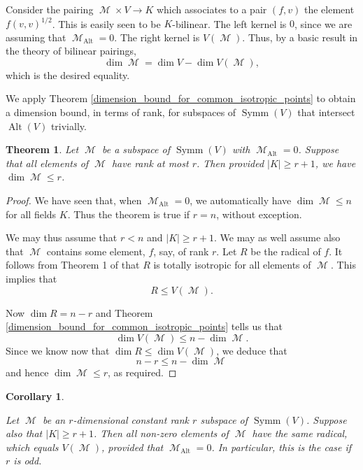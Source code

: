 \documentclass{amsart}
\DeclareMathOperator{\Alt}{Alt}
\DeclareMathOperator{\M}{\mathcal{M}}
\DeclareMathOperator{\Symm}{Symm}
\theoremstyle{plain}
\newtheorem{theorem}{Theorem}
\newtheorem{corollary}{Corollary}
\theoremstyle{definition}
\begin{document}
Consider the pairing $\M\times V\to K$ which associates to a pair $(f,v)$ the element $f(v,v)^{1/2}$. This is easily seen to be $K$-bilinear.
The left kernel is $0$, since we are assuming that $\M_{\Alt}=0$. The right kernel is $V(\M)$. Thus, by a basic result in the theory of
bilinear pairings,
\[
 \dim \M=\dim V-\dim V(\M),
\]
which is the desired equality.

We apply Theorem \ref{dimension_bound_for_common_isotropic_points} to obtain a dimension bound, in terms of rank, 
for subspaces of $\Symm(V)$ that intersect $\Alt(V)$ trivially.


\begin{theorem} \label{rank_related_dimension_bound}
Let $\M$ be a subspace of $\Symm(V)$ with $\M_{\Alt}=0$. Suppose that all elements of $\M$ have rank at most $r$. Then provided $|K|\geq r+1$,
we have $\dim \M\leq r$. 
\end{theorem}

\begin{proof}
 
We have seen that, when $\M_{\Alt}=0$, we automatically have $\dim \M\leq n$ for all fields $K$. Thus the theorem is true if $r=n$, without exception.

We may thus assume that $r<n$ and $|K|\geq r+1$. We may as well assume also that $\M$ contains some element, $f$, say, of rank $r$. Let
$R$ be the radical of $f$. It follows from Theorem 1 of \cite{Gow2} that $R$ is totally isotropic for all elements of $\M$. This implies that
\[
 R\leq V(\M). 
\]

Now $\dim R=n-r$ and Theorem \ref{dimension_bound_for_common_isotropic_points} tells us that
\[
\dim V(\M)\leq n-\dim \M.
\]
Since we know now that $\dim R\leq \dim V(\M)$, we deduce that
\[
 n-r\leq n-\dim \M
\]
and hence $\dim \M\leq r$, as required.
\end{proof}

\begin{corollary} \label{common_radicals}
 
Let $\M$ be an $r$-dimensional constant rank $r$ subspace of $\Symm(V)$. Suppose also that $|K|\geq r+1$. Then all non-zero
elements of $\M$ have the same radical, which equals $V(\M)$, provided that $\M_{\Alt}=0$. In particular, this is the case if $r$ is odd.
\end{corollary}
\end{document}
